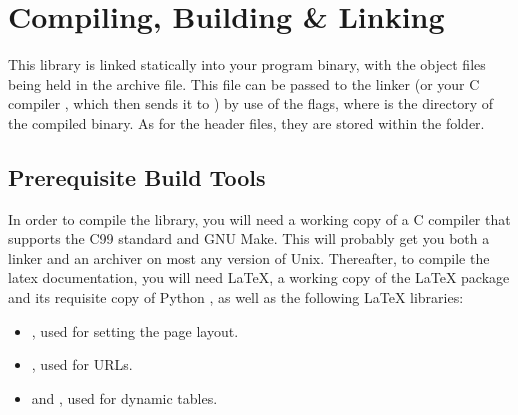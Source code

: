 %
%
%

\section{Compiling, Building \& Linking}

This library is linked statically into your program binary, with the  object files being held in the  archive file. This file can be passed to the linker  (or your C compiler , which then sends it to ) by use of the  flags, where  is the directory of the compiled binary. As for the header files, they are stored within the  folder.

\subsection{Prerequisite Build Tools}

In order to compile the library, you will need a working copy of a C compiler that supports the C99 standard and GNU Make. This will probably get you both a linker and an archiver on most any version of Unix. Thereafter, to compile the latex documentation, you will need \LaTeX{}, a working copy of the  \LaTeX{} package and its requisite copy of Python , as well as the following \LaTeX{} libraries:

\begin{itemize}
	\item {}, used for setting the page layout.
	\item {}, used for URLs.
	\item {} and , used for dynamic tables.
\end{itemize}

